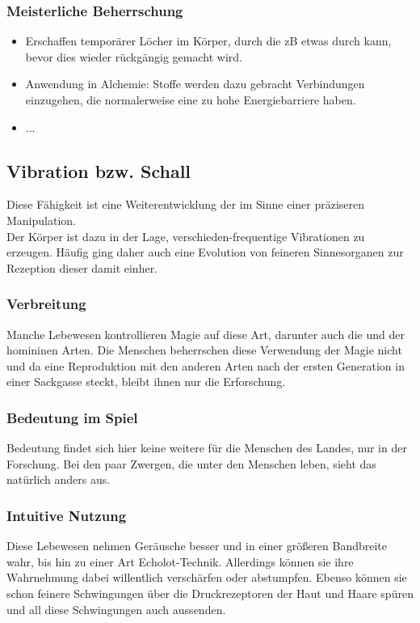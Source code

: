 \subsubsection{Meisterliche Beherrschung} 
\begin{itemize}
	\item Erschaffen temporärer Löcher im Körper, durch die zB etwas durch kann, bevor dies wieder rückgängig gemacht wird.
	\item Anwendung in Alchemie: Stoffe werden dazu gebracht Verbindungen einzugehen, die normalerweise eine zu hohe Energiebarriere haben.
	\item ...
\end{itemize}



\subsection{Vibration bzw. Schall}\label{sec:vibrationsmagie}
Diese Fähigkeit ist eine Weiterentwicklung der  im Sinne einer präziseren Manipulation.\\
Der Körper ist dazu in der Lage, verschieden-frequentige Vibrationen zu erzeugen. Häufig ging daher auch eine Evolution von feineren Sinnesorganen zur Rezeption dieser damit einher.

\subsubsection{Verbreitung}
Manche Lebewesen kontrollieren Magie auf diese Art, darunter auch die  und  der homininen Arten. Die Menschen beherrschen diese Verwendung der Magie nicht und da eine Reproduktion mit den anderen Arten nach der ersten Generation in einer Sackgasse steckt, bleibt ihnen nur die Erforschung.

\subsubsection{Bedeutung im Spiel}
Bedeutung findet sich hier keine weitere für die Menschen des Landes, nur in der Forschung. Bei den paar Zwergen, die unter den Menschen leben, sieht das natürlich anders aus.

\subsubsection{Intuitive Nutzung}
Diese Lebewesen nehmen Geräusche besser und in einer größeren Bandbreite wahr, bis hin zu einer Art Echolot-Technik. Allerdings können sie ihre Wahrnehmung dabei willentlich verschärfen oder abstumpfen. Ebenso können sie schon feinere Schwingungen über die Druckrezeptoren der Haut und Haare spüren und all diese Schwingungen auch aussenden.

